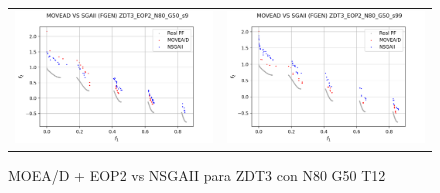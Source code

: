 \begin{figure}[H]
\begin{tabular}{c c}
    \includegraphics[scale=0.5]{figures/ZDT3_EOP2_N80_G50_T12/s9_comp.png} &
    \includegraphics[scale=0.5]{figures/ZDT3_EOP2_N80_G50_T12/s99_comp.png}\\
    \end{tabular}
    \caption{\centering MOEA/D + EOP2 vs NSGAII para ZDT3 con N80 G50 T12}
    \label{fig:9}
\end{figure}



